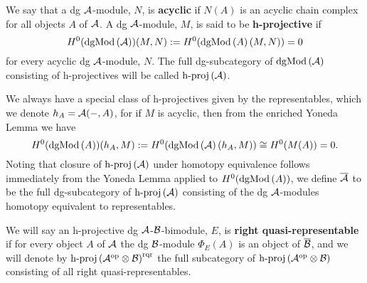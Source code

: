 We say that a dg \(\mathcal{A}\)-module, \(N\), is \textbf{acyclic} if \(N(A)\) is an acyclic chain complex for all objects \(A\) of \(\mathcal{A}\).
A dg \(\mathcal{A}\)-module, \(M\), is said to be \textbf{h-projective} if
\[H^0(\operatorname{dgMod}\left(\mathcal{A}\right))(M,N) := H^0(\operatorname{dgMod}\left(A\right)(M,N)) = 0\]
for every acyclic dg \(\mathcal{A}\)-module, \(N\).
The full dg-subcategory of \(\operatorname{dgMod}\left(\mathcal{A}\right)\) consisting of h-projectives will be called \(\operatorname{h-proj}\left(\mathcal{A}\right)\).

We always have a special class of h-projectives given by the representables, which we denote \(h_A = \mathcal{A}(-, A)\), for if \(M\) is acyclic, then from the enriched Yoneda Lemma we have
\[H^0(\operatorname{dgMod}\left(A\right))(h_A,M) := H^0(\operatorname{dgMod}\left(\mathcal{A}\right)(h_A, M)) \cong H^0(M(A)) = 0.\]
Noting that closure of \(\operatorname{h-proj}\left(\mathcal{A}\right)\) under homotopy equivalence follows immediately from the Yoneda Lemma applied to \(H^0(\operatorname{dgMod}\left(A\right))\), we define \(\overline{\mathcal{A}}\) to be the full dg-subcategory of \(\operatorname{h-proj}\left(\mathcal{A}\right)\) consisting of the dg \(\mathcal{A}\)-modules homotopy equivalent to representables.

We will say an h-projective dg \(\mathcal{A}\)-\(\mathcal{B}\)-bimodule, \(E\), is \textbf{right quasi-representable} if for every object \(A\) of \(\mathcal{A}\) the dg \(\mathcal{B}\)-module \(\Phi_E(A)\) is an object of \(\overline{\mathcal{B}}\), and we will denote by \(\operatorname{h-proj}\left(\mathcal{A}^{\operatorname{op}} \otimes \mathcal{B}\right)^{\operatorname{rqr}}\) the full subcategory of \(\operatorname{h-proj}\left(\mathcal{A}^{\operatorname{op}} \otimes \mathcal{B}\right)\) consisting of all right quasi-representables.

